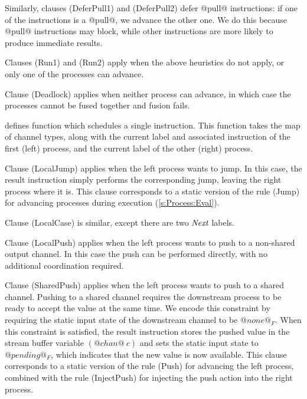 Similarly, clauses (DeferPull1) and (DeferPull2) defer @pull@ instructions: if one of the instructions is a @pull@, we advance the other one. We do this because @pull@ instructions may block, while other instructions are more likely to produce immediate results.

Clauses (Run1) and (Run2) apply when the above heuristics do not apply, or only one of the processes can advance.

Clause (Deadlock) applies when neither process can advance, in which case the processes cannot be fused together and fusion fails.




\smallskip
{} defines function  which schedules a single instruction. This function takes the map of channel types, along with the current label and associated instruction of the first (left) process, and the current label of the other (right) process.

Clause (LocalJump) applies when the left process wants to jump.
In this case, the result instruction simply performs the corresponding jump, leaving the right process where it is.
This clause corresponds to a static version of the rule (Jump) for advancing processes during execution (\cref{s:Process:Eval}).

Clause (LocalCase) is similar, except there are two $\textit{Next}$ labels.

Clause (LocalPush) applies when the left process wants to push to a non-shared output channel.
In this case the push can be performed directly, with no additional coordination required.

Clause (SharedPush) applies when the left process wants to push to a shared channel.
Pushing to a shared channel requires the downstream process to be ready to accept the value at the same time.
We encode this constraint by requiring the static input state of the downstream channel to be $@none@_F$.
When this constraint is satisfied, the result instruction stores the pushed value in the stream buffer variable $(@chan@~c)$ and sets the static input state to $@pending@_F$, which indicates that the new value is now available.
This clause corresponds to a static version of the rule (Push) for advancing the left process, combined with the rule (InjectPush) for injecting the push action into the right process.

